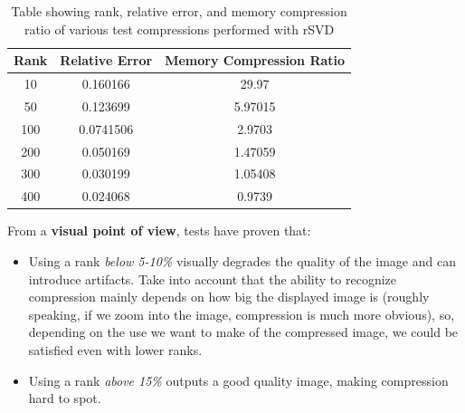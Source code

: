 \documentclass[11pt,a4paper]{article}
\begin{document}
\begin{table}[h]
    \centering
    \begin{tabular}{|c|c|c|}
        \hline
        Rank & Relative Error & Memory Compression Ratio \\
        \hline
         10 &0.160166  &29.97  \\
        \hline
         50 &0.123699  &5.97015  \\
        \hline
         100 &0.0741506  &2.9703  \\
        \hline
        200 &0.050169 &1.47059 \\
        \hline
        300 &0.030199 &1.05408 \\
        \hline
        400 &0.024068 &0.9739 \\
        \hline
    \end{tabular}
    \caption{Table showing rank, relative error, and memory compression ratio of various test compressions performed with rSVD}
    \label{tab:compression}
\end{table}

From a \textbf{visual point of view}, tests have proven that:
\begin{itemize}
    \item Using a rank \textit{below 5-10\%} visually degrades the quality of the image and can introduce artifacts. Take into account that the ability to recognize compression mainly depends on how big the displayed image is (roughly speaking, if we zoom into the image, compression is much more obvious), so, depending on the use we want to make of the compressed image, we could be satisfied even with lower ranks.
    \item Using a rank \textit{above 15\%} outputs a good quality image, making compression hard to spot.
\end{itemize}
\end{document}
